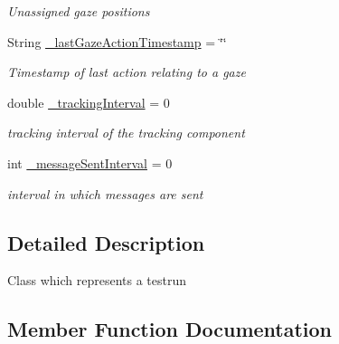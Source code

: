 \begin{DoxyCompactItemize}
\begin{DoxyCompactList}\small\item\em Unassigned gaze positions \end{DoxyCompactList}\item 
String \hyperlink{class_web_analyzer_1_1_models_1_1_data_model_1_1_test_model_a9969004441000c661fe533b8d954ec54}{\+\_\+last\+Gaze\+Action\+Timestamp} = \char`\"{}\char`\"{}
\begin{DoxyCompactList}\small\item\em Timestamp of last action relating to a gaze \end{DoxyCompactList}\item 
double \hyperlink{class_web_analyzer_1_1_models_1_1_data_model_1_1_test_model_a7f6665a0e91e4a550aed5bf34765a990}{\+\_\+tracking\+Interval} = 0
\begin{DoxyCompactList}\small\item\em tracking interval of the tracking component \end{DoxyCompactList}\item 
int \hyperlink{class_web_analyzer_1_1_models_1_1_data_model_1_1_test_model_a7ef435f4317bf383688e0d6c672581d4}{\+\_\+message\+Sent\+Interval} = 0
\begin{DoxyCompactList}\small\item\em interval in which messages are sent \end{DoxyCompactList}\end{DoxyCompactItemize}


\subsection{Detailed Description}
Class which represents a testrun 



\subsection{Member Function Documentation}
\hypertarget{class_web_analyzer_1_1_models_1_1_data_model_1_1_test_model_ad58dc0c0e38b5663113167469c248796}{}
